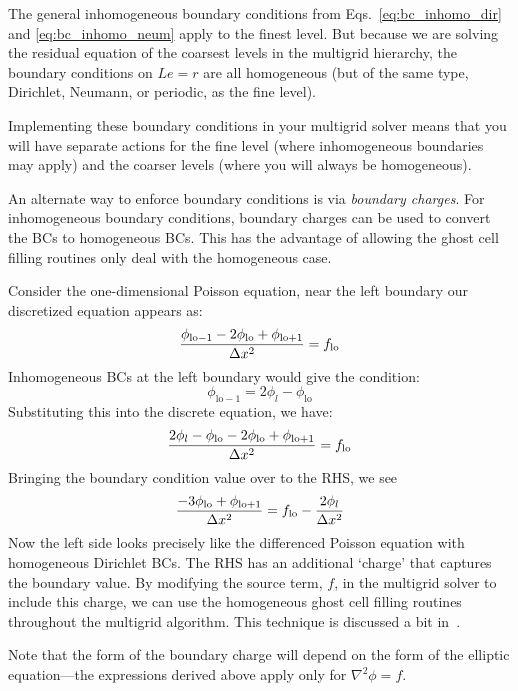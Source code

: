 The general inhomogeneous boundary conditions from
Eqs.~\ref{eq:bc_inhomo_dir} and \ref{eq:bc_inhomo_neum} apply to the
finest level.  But because we are solving the residual equation of the
coarsest levels in the multigrid hierarchy, the boundary conditions on
$Le = r$ are all homogeneous (but of the same type, Dirichlet,
Neumann, or periodic, as the fine level).

Implementing these boundary conditions in your multigrid solver means
that you will have separate actions for the fine level (where
inhomogeneous boundaries may apply) and the coarser levels (where you
will always be homogeneous).

An alternate way to enforce boundary conditions is via {\em boundary
  charges}.  For inhomogeneous boundary conditions, boundary charges
can be used to convert the BCs to homogeneous BCs.  This has the
advantage of allowing the ghost cell filling routines only deal with
the homogeneous case.

Consider the one-dimensional Poisson equation, near the left boundary
our discretized equation appears as:
\begin{equation}
\frac{\phi_\mathrm{lo-1} - 2\phi_\mathrm{lo} + \phi_\mathrm{lo+1}}{\Delta x^2}
 = f_\mathrm{lo}
\end{equation}
Inhomogeneous BCs at the left boundary would give the condition:
\begin{equation}
\phi_\mathrm{lo-1} = 2 \phi_l - \phi_\mathrm{lo}
\end{equation}
Substituting this into the discrete equation, we have:
\begin{equation}
\frac{2 \phi_l - \phi_\mathrm{lo} - 2\phi_\mathrm{lo} + \phi_\mathrm{lo+1}}{\Delta x^2}
 = f_\mathrm{lo}
\end{equation}
Bringing the boundary condition value over to the RHS, we see
\begin{equation}
\frac{- 3\phi_\mathrm{lo} + \phi_\mathrm{lo+1}}{\Delta x^2}
 = f_\mathrm{lo} - \frac{2\phi_l}{\Delta x^2}
\end{equation}
Now the left side looks precisely like the differenced Poisson equation
with homogeneous Dirichlet BCs.  The RHS has an additional `charge' that
captures the boundary value.  By modifying the source term, $f$, in the
multigrid solver to include this charge, we can use the homogeneous 
ghost cell filling routines throughout the multigrid algorithm.
This technique is discussed a bit in~\cite{colellanotes}.

Note that the form of the boundary charge will depend on the form of the
elliptic equation---the expressions derived above apply only for
$\nabla^2 \phi = f$.




